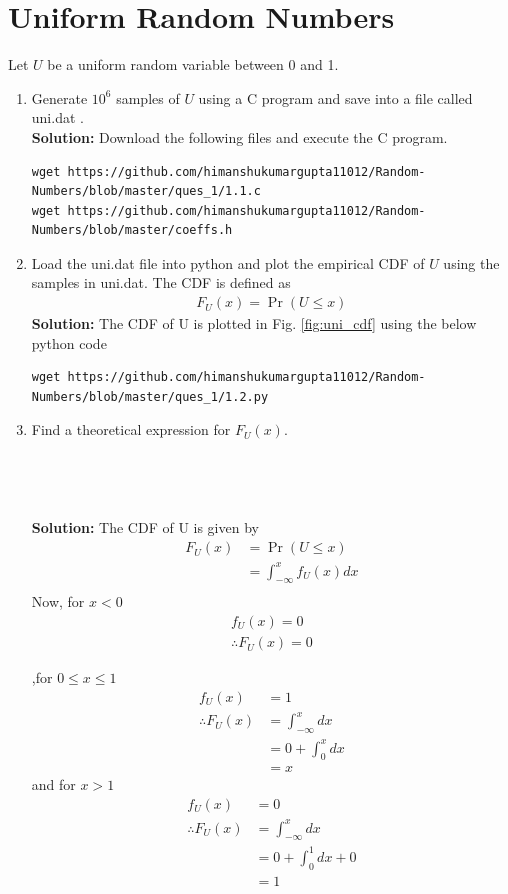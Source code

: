 \documentclass[journal,12pt,twocolumn]{IEEEtran}
\renewcommand\thesection{\arabic{section}}
\providecommand{\pr}[1]{\ensuremath{\Pr\left(#1\right)}}
\theoremstyle{remark}
\newcommand{\solution}{\noindent \textbf{Solution: }}
\numberwithin{equation}{section}
\begin{document}
\section{Uniform Random Numbers}
Let $U$ be a uniform random variable between 0 and 1.
\begin{enumerate}[label=\thesection.\arabic*
,ref=\thesection.\theenumi]
\item Generate $10^6$ samples of $U$ using a C program and save into a file called uni.dat .
\\
\solution Download the following files and execute the  C program.
\begin{lstlisting}
wget https://github.com/himanshukumargupta11012/Random-Numbers/blob/master/ques_1/1.1.c
wget https://github.com/himanshukumargupta11012/Random-Numbers/blob/master/coeffs.h
\end{lstlisting}
%
\item
Load the uni.dat file into python and plot the empirical CDF of $U$ using the samples in uni.dat. The CDF is defined as
\begin{align}
F_{U}(x) = \pr{U \le x}
\end{align}
\solution The CDF of U is plotted in Fig. \ref{fig:uni_cdf}
using the below python code
\begin{lstlisting}
wget https://github.com/himanshukumargupta11012/Random-Numbers/blob/master/ques_1/1.2.py
\end{lstlisting}
%
\item
Find a  theoretical expression for $F_{U}(x)$.
\\
\\
\\
\\
\\

\solution 
The CDF of U is given by
\begin{align}
	F_U(x)&=\pr{ U\leq x}\\
	&=\int_{-\infty}^x f_U(x)dx\\
\end{align}
Now, for $x<0$
\begin{align}
	f_U(x)=0\\
\therefore F_U(x)=0
\end{align}


,for $0\leq x \leq1$
\begin{align}
	f_U(x)&=1\\
\therefore F_U(x)&=\int_{-\infty}^x dx\\
	&=0+\int_{0}^x dx\\
	&=x
\end{align}
and for $x>1$
\begin{align}
	f_U(x)&=0\\
\therefore F_U(x)&=\int_{-\infty}^x dx\\
	&=0+\int_{0}^1 dx+0\\
	&=1
\end{align}


\end{enumerate}
\end{document}

